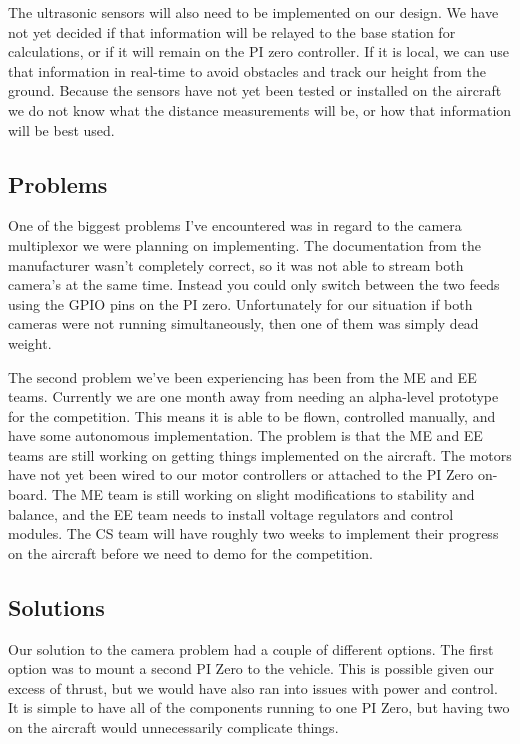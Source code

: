 \documentclass[onecolumn, draftclsnofoot,10pt, compsoc]{IEEEtran}
\begin{document}
The ultrasonic sensors will also need to be implemented on our design. We have not yet decided if that information will be relayed to the base station for calculations, or if it will remain on the PI zero controller. If it is local, we can use that information in real-time to avoid obstacles and track our height from the ground. Because the sensors have not yet been tested or installed on the aircraft we do not know what the distance measurements will be, or how that information will be best used.


\subsection{Problems}

One of the biggest problems I've encountered was in regard to the camera multiplexor we were planning on implementing. The documentation from the manufacturer wasn't completely correct, so it was not able to stream both camera’s at the same time. Instead you could only switch between the two feeds using the GPIO pins on the PI zero. Unfortunately for our situation if both cameras were not running simultaneously, then one of them was simply dead weight.

The second problem we've been experiencing has been from the ME and EE teams. Currently we are one month away from needing an alpha-level prototype for the competition. This means it is able to be flown, controlled manually, and have some autonomous implementation. The problem is that the ME and EE teams are still working on getting things implemented on the aircraft. The motors have not yet been wired to our motor controllers or attached to the PI Zero on-board. The ME team is still working on slight modifications to stability and balance, and the EE team needs to install voltage regulators and control modules. The CS team will have roughly two weeks to implement their progress on the aircraft before we need to demo for the competition.

\subsection{Solutions}

Our solution to the camera problem had a couple of different options. The first option was to mount a second PI Zero to the vehicle. This is possible given our excess of thrust, but we would have also ran into issues with power and control. It is simple to have all of the components running to one PI Zero, but having two on the aircraft would unnecessarily complicate things.
\end{document}
